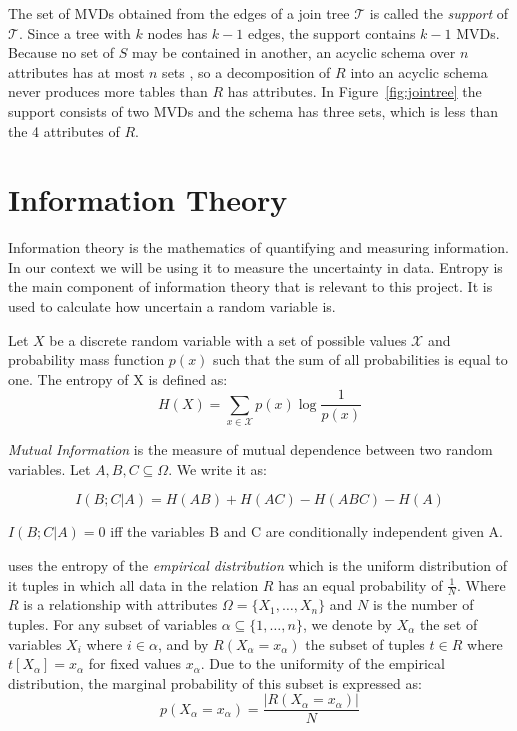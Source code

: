 \documentclass[logo,bsc,singlespacing,parskip,online]{infthesis}
\begin{document}
The set of MVDs obtained from the edges of a join tree $\mathcal{T}$ is called the \emph{support} of $\mathcal{T}$. Since a tree with $k$ nodes has $k-1$ edges, the support contains $k-1$ MVDs. Because no set of $S$ may be contained in another, an acyclic schema over $n$ attributes has at most $n$ sets \citep{DBLP:journals/jacm/BeeriFMY83}, so a decomposition of $R$ into an acyclic schema never produces more tables than $R$ has attributes. In Figure~\ref{fig:jointree} the support consists of two MVDs and the schema has three sets, which is less than the 4 attributes of $R$.

\section{Information Theory}
\label{Information Theory}

Information theory is the mathematics of quantifying and measuring information. In our context we will be using it to measure the uncertainty in data. Entropy is the main component of information theory that is relevant to this project. It is used to calculate how uncertain a random variable is. 

Let $X$ be a discrete random variable with a set of possible values $\mathcal{X}$ and probability mass function $p(x)$ such that the sum of all probabilities is equal to one. The entropy of X is defined as:
\begin{equation}
  H(X) = \sum_{x \in \mathcal{X}} p(x) \log \frac{1}{p(x)}
  \label{eq:entropy}
\end{equation}

\emph{Mutual Information} is the measure of mutual dependence between two random variables. Let $A,B,C \subseteq \Omega$. We write it as:

\begin{equation}
  I(B;C|A) = H(AB) + H(AC) - H(ABC) - H(A)
\end{equation}

$I(B;C|A) = 0$ iff the variables B and C are conditionally independent given A.

\citet{DBLP:conf/sigmod/KenigMPSS20} uses the entropy of the \emph{empirical distribution} which is the uniform distribution of it tuples in which all data in the relation $R$ has an equal probability of $\frac{1}{N}$. Where $R$ is a relationship with attributes $\Omega = \{X_1, \ldots, X_n\}$ and $N$ is the number of tuples. For any subset of variables $\alpha \subseteq \{1, \ldots, n\}$, we denote by $X_\alpha$ the set of variables $X_i$ where $i \in \alpha$, and by $R(X_\alpha = x_\alpha)$ the subset of tuples $t \in R$ where $t[X_\alpha] = x_\alpha$ for fixed values $x_\alpha$. Due to the uniformity of the empirical distribution, the marginal probability of this subset is expressed as:
\begin{equation}
p(X_\alpha = x_\alpha) = \frac{|R(X_\alpha = x_\alpha)|}{N}
\end{equation}
\end{document}
